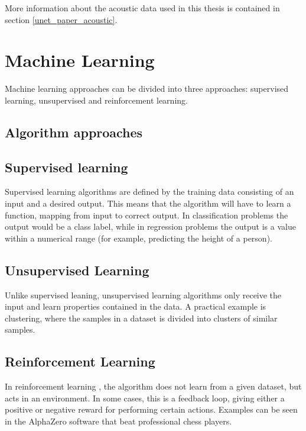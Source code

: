     More information about the acoustic data used in this thesis is contained in section \ref{unet_paper_acoustic}. 
\clearpage
\section{Machine Learning} \label{Machine Learning}
    Machine learning approaches can be divided into three approaches\cite{Goodfellow-et-al-2016_E}: supervised learning, unsupervised and reinforcement learning. 
    
    \subsection{Algorithm approaches} \label{Algorithm types}
        \subsection{Supervised learning}
            Supervised learning \cite{Goodfellow-et-al-2016_E} algorithms are defined by the training data consisting of an input and a desired output. This means that the algorithm will have to learn a function, mapping from input to correct output. In classification problems the output would be a class label, while in regression problems the output is a value within a numerical range (for example, predicting the height of a person).
            
        \subsection{Unsupervised Learning}
            Unlike supervised leaning, unsupervised learning algorithms only receive the input and learn properties contained in the data\cite{Goodfellow-et-al-2016_E}. A practical example is clustering, where the samples in a dataset is divided into clusters of similar samples. 
                
        \subsection{Reinforcement Learning}
            In reinforcement learning \cite{Goodfellow-et-al-2016_E}, the algorithm does not learn from a given dataset, but acts in an environment. In some cases, this is a feedback loop, giving either a positive or negative reward for performing certain actions. Examples can be seen in the AlphaZero software that beat professional chess players\cite{silver2017mastering}.
    
